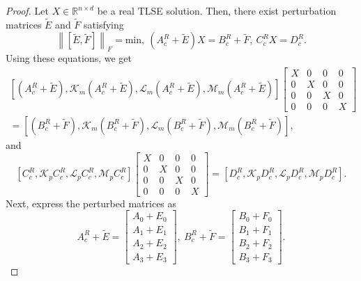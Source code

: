 \documentclass[preprint,11pt,3p]{elsarticle}
\newcommand\norm[1]{\left\lVert#1\right\rVert}
\def \R{{\mathbb R}}
\begin{document}
\begin{proof}
	Let $X \in \R^{n \times d}$ be a real TLSE solution. Then, there exist perturbation matrices $\widetilde{E}$ and $\widetilde{F}$ satisfying
	\begin{equation*}
		\norm{[\widetilde{E}, \widetilde{F}]}_F= \textrm{min}, ~	(A^R_c+ \widetilde{E})X= B^R_c+ \widetilde{F}, ~ C^R_cX=D^R_c.
	\end{equation*}
	Using these equations, we get
	\begin{align}\label{eq3.5}
		\left[(A^R_c+ \widetilde{E}), \mathcal{K}_m (A^R_c+ \widetilde{E}), \mathcal{L}_m (A^R_c+ \widetilde{E}), \mathcal{M}_m (A^R_c+ \widetilde{E})\right]
		\begin{bmatrix}
			X & 0 & 0 & 0 \\
			0 & X & 0 & 0 \\
			0 & 0 & X & 0 \\
			0 & 0 & 0 & X
		\end{bmatrix} \nonumber &\\= \left[(B^R_c+ \widetilde{F}), \mathcal{K}_m (B^R_c+ \widetilde{F}), \mathcal{L}_m (B^R_c+ \widetilde{F}), \mathcal{M}_m (B^R_c+ \widetilde{F}) \right],
	\end{align}
and
	\begin{equation}\label{eq3.51}
		\left[C^R_c, \mathcal{K}_p C^R_c, \mathcal{L}_p C^R_c, \mathcal{M}_p C^R_c\right]	\begin{bmatrix}
			X & 0 & 0 & 0 \\
			0 & X & 0 & 0 \\
			0 & 0 & X & 0 \\
			0 & 0 & 0 & X
		\end{bmatrix} = \left[D^R_c, \mathcal{K}_p D^R_c, \mathcal{L}_p D^R_c, \mathcal{M}_p D^R_c\right].
	\end{equation}
Next, express the perturbed matrices as
	\begin{equation}\label{eq3.6}
		A^R_c + \widetilde{E}= 
		\begin{bmatrix}
			A_{0}+ E_{0} \\
			A_{1}+ E_{1} \\
			A_{2}+ E_{2} \\
			A_{3}+ E_{3} 
		\end{bmatrix}, ~ B^R_c+\widetilde{F}= 
		\begin{bmatrix}
			B_0+ F_0 \\
			B_1+ F_1  \\
			B_2+ F_2 \\
			B_3+ F_3
		\end{bmatrix}.

\end{equation}
\end{proof}
\end{document}
